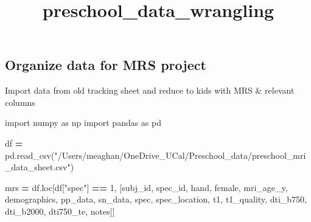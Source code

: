 \documentclass[
]{article}
\title{preschool\_data\_wrangling}
\author{}
\date{\vspace{-2.5em}}
\newenvironment{Shaded}{\begin{snugshade}}{\end{snugshade}}
\newcommand{\ImportTok}[1]{#1}
\newcommand{\NormalTok}[1]{#1}
\newcommand{\OperatorTok}[1]{\textcolor[rgb]{0.81,0.36,0.00}{\textbf{#1}}}
\newcommand{\StringTok}[1]{\textcolor[rgb]{0.31,0.60,0.02}{#1}}
\begin{document}
\maketitle

\hypertarget{organize-data-for-mrs-project}{%
\subsection{Organize data for MRS
project}\label{organize-data-for-mrs-project}}

Import data from old tracking sheet and reduce to kids with MRS \&
relevant columns

\begin{Shaded}
\begin{Highlighting}[]
\ImportTok{import}\NormalTok{ numpy }\ImportTok{as}\NormalTok{ np}
\ImportTok{import}\NormalTok{ pandas }\ImportTok{as}\NormalTok{ pd }

\NormalTok{df }\OperatorTok{=}\NormalTok{ pd.read\_csv(}\StringTok{"/Users/meaghan/OneDrive\_UCal/Preschool\_data/preschool\_mri\_data\_sheet.csv"}\NormalTok{)}

\NormalTok{mrs }\OperatorTok{=}\NormalTok{ df.loc[df[}\StringTok{"spec"}\NormalTok{] }\OperatorTok{==} \StringTok{\textquotesingle{}1\textquotesingle{}}\NormalTok{, [}\StringTok{\textquotesingle{}subj\_id\textquotesingle{}}\NormalTok{, }\StringTok{\textquotesingle{}spec\_id\textquotesingle{}}\NormalTok{, }\StringTok{\textquotesingle{}hand\textquotesingle{}}\NormalTok{, }\StringTok{\textquotesingle{}female\textquotesingle{}}\NormalTok{, }\StringTok{\textquotesingle{}mri\_age\_y\textquotesingle{}}\NormalTok{, }\StringTok{\textquotesingle{}demographics\textquotesingle{}}\NormalTok{, }\StringTok{\textquotesingle{}pp\_data\textquotesingle{}}\NormalTok{, }\StringTok{\textquotesingle{}sn\_data\textquotesingle{}}\NormalTok{, }\StringTok{\textquotesingle{}spec\textquotesingle{}}\NormalTok{, }\StringTok{\textquotesingle{}spec\_location\textquotesingle{}}\NormalTok{, }\StringTok{\textquotesingle{}t1\textquotesingle{}}\NormalTok{, }\StringTok{\textquotesingle{}t1\_quality\textquotesingle{}}\NormalTok{, }\StringTok{\textquotesingle{}dti\_b750\textquotesingle{}}\NormalTok{, }\StringTok{\textquotesingle{}dti\_b2000\textquotesingle{}}\NormalTok{, }\StringTok{\textquotesingle{}dti750\_te\textquotesingle{}}\NormalTok{, }\StringTok{\textquotesingle{}notes\textquotesingle{}}\NormalTok{]]}
\end{Highlighting}
\end{Shaded}
\end{document}
